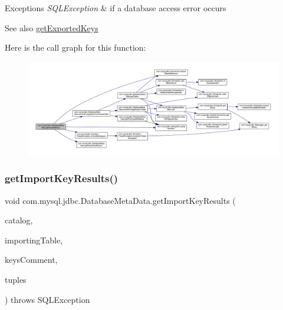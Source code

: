 \begin{DoxyExceptions}{Exceptions}
{\em S\+Q\+L\+Exception} & if a database access error occurs \\
\hline
\end{DoxyExceptions}
\begin{DoxySeeAlso}{See also}
\mbox{\hyperlink{classcom_1_1mysql_1_1jdbc_1_1_database_meta_data_a17c160fdaac4749922b8ec683b4ab138}{get\+Exported\+Keys}} 
\end{DoxySeeAlso}
Here is the call graph for this function\+:\nopagebreak
\begin{figure}[H]
\begin{center}
\leavevmode
\includegraphics[width=350pt]{classcom_1_1mysql_1_1jdbc_1_1_database_meta_data_a0161436eb7ad9574d25bd90730891e25_cgraph}
\end{center}
\end{figure}
\mbox{\label{classcom_1_1mysql_1_1jdbc_1_1_database_meta_data_a10b27f9a10b42626ac7b3c8f9571299d}} 
\subsubsection{\texorpdfstring{get\+Import\+Key\+Results()}{getImportKeyResults()}}
{\footnotesize\ttfamily void com.\+mysql.\+jdbc.\+Database\+Meta\+Data.\+get\+Import\+Key\+Results (\begin{DoxyParamCaption}\item[{String}]{catalog,  }\item[{String}]{importing\+Table,  }\item[{String}]{keys\+Comment,  }\item[{List$<$ \mbox{\hyperlink{classcom_1_1mysql_1_1jdbc_1_1_result_set_row}{Result\+Set\+Row}} $>$}]{tuples }\end{DoxyParamCaption}) throws S\+Q\+L\+Exception\hspace{0.3cm}{\ttfamily [protected]}}

